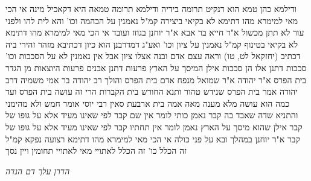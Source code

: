 \documentclass[12pt, openany]{book}
\begin{document}
{ודילמא כהן טמא הוא  דנקיט תרומה בידיה  ודילמא תרומה טמאה היא  דקאכיל מינה 
אי הכי מאי למימרא  מהו דתימא  לא בקיאי ביצירה קמ"ל
נאמנין על הבהמה וכו' והא לית להו ולפני עור לא תתן מכשול  א"ר חייא בר אבא א"ר יוחנן  בגוזז ועובד 
אי הכי מאי למימרא  מהו דתימא  לא בקיאי בטינוף קמ"ל
נאמנין על ציון וכו' ואע"ג דמדרבנן הוא כיון דכתיבא מזהר זהירי ביה דכתיב  (יחזקאל לט, טו) וראה עצם אדם ובנה אצלו ציון
אבל אין נאמנין לא על הסככות וכו' סככות דתנן  אלו הן סככות אילן המיסך על הארץ  פרעות דתנן  אבנים פרעות היוצאות מן הגדר 
בית הפרס א"ר יהודה א"ר שמואל  מנפח אדם בית הפרס והולך 
רב יהודה בר אמי משמיה דרב יהודה אמר  בית הפרס שנידש טהור  ותנא  החורש בית הקברות הרי זה עושה בית הפרס  ועד כמה הוא עושה  מלא מענה מאה אמה בית ארבעת סאין  רבי יוסי אומר  חמש 
ולא מהימני  והתניא  שדה שאבד בה קבר נאמן כותי לומר אין שם קבר
לפי שאינו מעיד אלא על גופו של קבר  אילן שהוא מיסך על הארץ נאמן לומר אין תחתיו קבר לפי שאינו מעיד אלא על גופו של קבר 
א"ר יוחנן  במהלך ובא על פני כולה 
אי הכי מאי למימרא  מהו דתימא  רצועה נפקא קמ"ל
זה הכלל כו' זה הכלל לאתויי מאי  לאתויי תחומין ויין נסך
\par \par {\large\emph{הדרן עלך דם הנדה}}\par \par }
\end{document}
